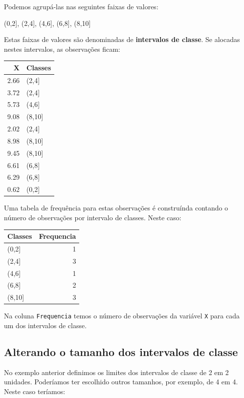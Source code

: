 \documentclass[
]{book}
\begin{document}
Podemos agrupá-las nas seguintes faixas de valores:

(0,2{]}, (2,4{]}, (4,6{]}, (6,8{]}, (8,10{]}

Estas faixas de valores são denominadas de \textbf{intervalos de classe}. Se alocadas nestes intervalos, as observações ficam:

\begin{tabular}{r|l}
\hline
X & Classes\\
\hline
2.66 & (2,4]\\
\hline
3.72 & (2,4]\\
\hline
5.73 & (4,6]\\
\hline
9.08 & (8,10]\\
\hline
2.02 & (2,4]\\
\hline
8.98 & (8,10]\\
\hline
9.45 & (8,10]\\
\hline
6.61 & (6,8]\\
\hline
6.29 & (6,8]\\
\hline
0.62 & (0,2]\\
\hline
\end{tabular}

Uma tabela de frequência para estas observações é construínda contando o número de observações por intervalo de classes. Neste caso:

\begin{tabular}{l|r}
\hline
Classes & Frequencia\\
\hline
(0,2] & 1\\
\hline
(2,4] & 3\\
\hline
(4,6] & 1\\
\hline
(6,8] & 2\\
\hline
(8,10] & 3\\
\hline
\end{tabular}

Na coluna \texttt{Frequencia} temos o número de observações da variável \texttt{X} para cada um dos intervalos de classe.

\hypertarget{alterando-o-tamanho-dos-intervalos-de-classe}{%
\subsection{Alterando o tamanho dos intervalos de classe}\label{alterando-o-tamanho-dos-intervalos-de-classe}}

No exemplo anterior definimos os limites dos intervalos de classe de 2 em 2 unidades. Poderíamos ter escolhido outros tamanhos, por exemplo, de 4 em 4. Neste caso teríamos:
\end{document}
